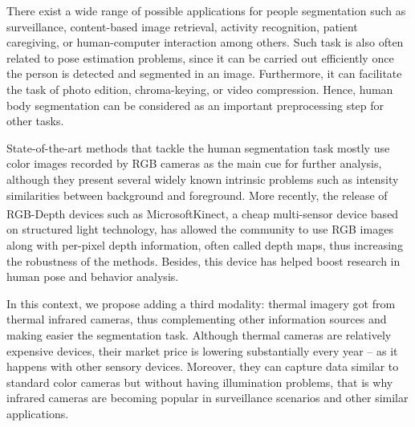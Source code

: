 \documentclass[10pt,twocolumn,letterpaper]{article}
\begin{document}
There exist a wide range of possible applications for people segmentation such as surveillance, content-based image retrieval, activity recognition, patient caregiving, or human-computer interaction among others. Such task is also often related to pose estimation problems, since it can be carried out efficiently once the person is detected and segmented in an image. Furthermore, it can facilitate the task of photo edition, chroma-keying, or video compression. Hence, human body segmentation can be considered as an important preprocessing step for other tasks.

State-of-the-art methods that tackle the human segmentation task mostly use color images recorded by RGB cameras as the main cue for further analysis, although they present several widely known intrinsic problems such as intensity similarities between background and foreground. More recently, the release of RGB-Depth devices such as Microsoft\textsuperscript\textregistered Kinect\textsuperscript\texttrademark , a cheap multi-sensor device based on structured light technology, has allowed the community to use RGB images along with per-pixel depth information, often called depth maps, thus increasing the robustness of the methods. Besides, this device has helped boost research in human pose and behavior analysis.

In this context, we propose adding a third modality: thermal imagery got from thermal infrared cameras, thus complementing other information sources and making easier the segmentation task. Although thermal cameras are relatively expensive devices, their market price is lowering substantially every year -- as it happens with other sensory devices. Moreover, they can capture data similar to standard color cameras but without having illumination problems, that is why infrared cameras are becoming popular in surveillance scenarios and other similar applications. 
\end{document}
